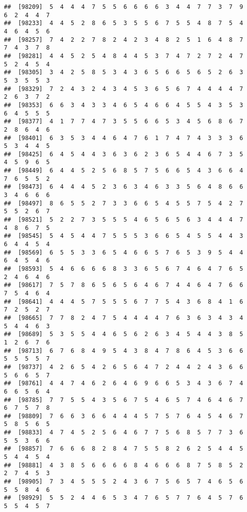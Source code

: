 \documentclass[
]{book}
\begin{document}
\begin{verbatim}
##  [98209]  5  4  4  4  7  5  5  6  6  6  6  3  4  4  7  7  3  7  9  6  2  4  4  7
##  [98233]  4  4  5  2  8  6  5  3  5  5  6  7  5  5  4  8  7  5  4  4  6  4  5  6
##  [98257]  7  4  2  2  7  8  2  4  2  3  4  8  2  5  1  6  4  8  7  7  4  3  7  8
##  [98281]  4  4  5  2  5  4  8  4  4  5  3  7  4  7  2  7  2  4  7  5  2  4  5  4
##  [98305]  3  4  2  5  8  5  3  4  3  6  5  6  6  5  6  5  2  6  3  5  3  5  5  3
##  [98329]  7  2  4  3  2  4  3  4  5  3  6  5  6  7  4  4  4  4  7  2  6  3  7  2
##  [98353]  6  6  3  4  3  3  4  6  5  4  6  6  4  5  5  4  3  5  3  6  4  5  5  5
##  [98377]  4  1  7  7  4  7  3  5  5  6  6  5  3  4  5  6  8  6  7  2  8  6  4  6
##  [98401]  6  3  5  3  4  4  6  4  7  6  1  7  4  7  4  3  3  3  6  5  3  4  4  5
##  [98425]  6  4  5  4  4  3  6  3  6  2  3  6  5  4  4  6  7  3  5  4  5  9  6  5
##  [98449]  6  4  4  5  2  5  6  8  5  7  5  6  6  5  4  3  6  6  4  7  6  5  5  2
##  [98473]  6  4  4  4  5  2  3  6  3  4  6  3  3  5  6  4  8  6  6  3  4  6  6  6
##  [98497]  8  6  5  5  2  7  3  3  6  6  5  4  5  5  7  5  4  2  7  5  5  2  6  7
##  [98521]  5  2  2  7  3  5  5  5  4  6  5  6  5  6  3  4  4  4  7  4  8  6  7  5
##  [98545]  5  4  5  4  4  7  5  5  5  3  6  6  5  4  5  5  4  4  3  6  4  4  5  4
##  [98569]  6  5  5  3  3  6  5  4  6  6  5  7  6  5  3  9  5  4  4  6  4  5  4  6
##  [98593]  5  4  6  6  6  6  8  3  3  6  5  6  7  4  6  4  7  6  5  2  4  6  4  6
##  [98617]  7  5  7  8  6  5  6  5  6  4  6  7  4  4  6  4  7  6  6  7  5  4  6  4
##  [98641]  4  4  4  5  7  5  5  5  6  7  7  5  4  3  6  8  4  1  6  7  2  5  2  7
##  [98665]  7  7  8  2  4  7  5  4  4  4  4  7  6  3  6  3  4  3  4  5  4  4  6  3
##  [98689]  5  3  5  5  4  4  6  5  6  2  6  3  4  5  4  4  3  8  5  1  2  6  7  6
##  [98713]  6  7  6  8  4  9  5  4  3  8  4  7  8  6  4  5  3  6  6  5  5  5  5  7
##  [98737]  4  2  6  5  4  2  6  5  6  4  7  2  4  4  2  4  3  6  6  5  6  6  5  7
##  [98761]  4  4  7  4  6  2  6  4  6  9  6  6  5  3  4  3  6  7  4  6  6  5  6  4
##  [98785]  7  7  5  5  4  3  5  6  7  5  4  6  5  7  4  6  4  6  7  6  7  5  7  8
##  [98809]  7  6  6  3  6  6  4  4  4  5  7  5  7  6  4  5  4  6  7  5  8  5  6  5
##  [98833]  4  7  4  5  2  5  6  4  6  7  7  5  6  8  5  7  7  3  6  5  5  3  6  6
##  [98857]  7  6  6  6  8  2  8  4  7  5  5  8  2  6  2  5  4  4  5  5  4  4  5  4
##  [98881]  4  3  8  5  6  6  6  6  8  4  6  6  6  8  7  5  8  5  2  2  7  4  5  3
##  [98905]  7  3  4  5  5  5  2  4  3  6  7  5  6  5  7  4  6  5  6  5  5  8  4  6
##  [98929]  5  5  2  4  4  6  5  3  4  7  6  5  7  7  6  4  5  7  6  5  5  4  5  7

\end{verbatim}
\end{document}
